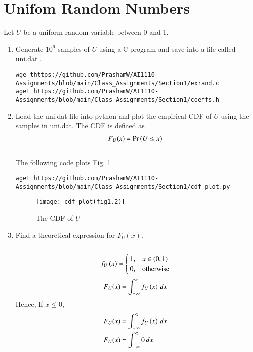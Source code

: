 \documentclass[journal,12pt,twocolumn]{IEEEtran}
\renewcommand\thesection{\arabic{section}}
\begin{document}
\section{Unifom Random Numbers}
Let $U$ be a uniform random variable between 0 and 1.
\begin{enumerate}[label=\thesection.\arabic*
,ref=\thesection.\theenumi]
\item Generate $10^6$ samples of $U$ using a C program and save into a file called uni.dat .
\\
\solution
\begin{lstlisting}
wge thttps://github.com/PrashamW/AI1110-Assignments/blob/main/Class_Assignments/Section1/exrand.c
wget https://github.com/PrashamW/AI1110-Assignments/blob/main/Class_Assignments/Section1/coeffs.h
\end{lstlisting}
%
\item
Load the uni.dat file into python and plot the empirical CDF of $U$ using the samples in uni.dat. The CDF is defined as
\begin{align}
F_{U}(x) = \Pr\left(U \le x\right)
\end{align}
\\
\solution  The following code plots Fig. \ref{fig:cdf_plot(fig1.2)}
\begin{lstlisting}
wget https://github.com/PrashamW/AI1110-Assignments/blob/main/Class_Assignments/Section1/cdf_plot.py
\end{lstlisting}
\begin{figure}
\centering
\texttt{[image: cdf\_plot(fig1.2)]}
\caption{The CDF of $U$}
\label{fig:cdf_plot(fig1.2)}
\end{figure}
%
\item
Find a  theoretical expression for $F_{U}(x)$.\\
\solution \\
\begin{align}  
f_{U}\left(x\right) = 
\begin{cases}
1, & x\in (0,1) \\
0, & \text{otherwise}
\end{cases}
\end{align}
\begin{equation}
    F_U(x) = \int_{-\infty}^{x} f_{U}\left(x\right) \,dx  \\
\end{equation}
Hence,
If $ x \leq 0 $,
\begin{align}
    F_U(x) &= \int_{-\infty}^{x} f_{U}\brak{x} \,dx  \\
    F_U(x) &= \int_{-\infty}^{x} 0 \,dx  \\

\end{align}
\end{enumerate}
\end{document}
